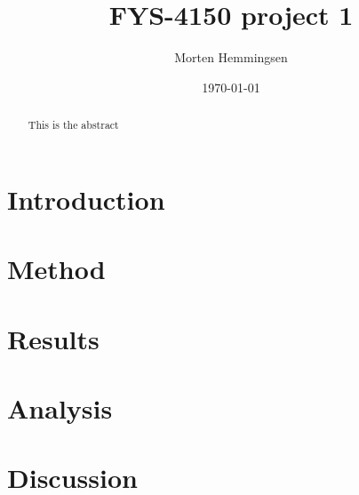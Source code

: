 \documentclass{article}
\title{FYS-4150 project 1}
\author{Morten Hemmingsen}
\date{\today}
\begin{document}
\maketitle
\newpage

\begin{abstract}
This is the abstract
\end{abstract}

\newpage



\section{Introduction}


\section{Method}


\section{Results}


\section{Analysis}


\section{Discussion}
\end{document}
